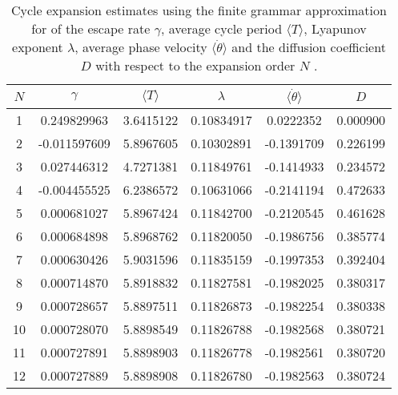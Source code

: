 \begin{table}
	\begin{tabular}{c|c|c|c|c|c}
	 $N$ & $\gamma$ & $\langle T \rangle$ & $\lambda$ & $\langle \dot{\theta} \rangle$ & $D$ \\ 
	\hline
	1 & 0.249829963 & 3.6415122 & 0.10834917 & 0.0222352 & 0.000900 \\ 
 	2 & -0.011597609 & 5.8967605 & 0.10302891 & -0.1391709 & 0.226199 \\ 
 	3 & 0.027446312 & 4.7271381 & 0.11849761 & -0.1414933 & 0.234572 \\ 
 	4 & -0.004455525 & 6.2386572 & 0.10631066 & -0.2141194 & 0.472633 \\ 
 	5 & 0.000681027 & 5.8967424 & 0.11842700 & -0.2120545 & 0.461628 \\ 
 	6 & 0.000684898 & 5.8968762 & 0.11820050 & -0.1986756 & 0.385774 \\ 
 	7 & 0.000630426 & 5.9031596 & 0.11835159 & -0.1997353 & 0.392404 \\ 
 	8 & 0.000714870 & 5.8918832 & 0.11827581 & -0.1982025 & 0.380317 \\ 
 	9 & 0.000728657 & 5.8897511 & 0.11826873 & -0.1982254 & 0.380338 \\ 
 	10 & 0.000728070 & 5.8898549 & 0.11826788 & -0.1982568 & 0.380721 \\ 
 	11 & 0.000727891 & 5.8898903 & 0.11826778 & -0.1982561 & 0.380720 \\ 
 	12 & 0.000727889 & 5.8898908 & 0.11826780 & -0.1982563 & 0.380724 \\ 
 	\end{tabular}
	\caption{Cycle expansion estimates using the finite grammar approximation for 
             of the escape rate $\gamma$, average cycle period $\langle T \rangle$, 
             Lyapunov exponent $\lambda$, average phase velocity 
             $\langle \dot{\theta} \rangle$ and the diffusion coefficient $D$ 
             with respect to the expansion order $N$ .}
	\label{t-DynamicalAverages}
\end{table}
